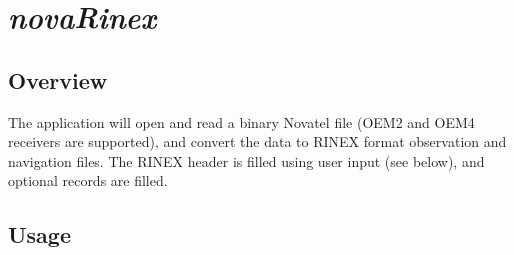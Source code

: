%
%

\section{\emph{novaRinex}}
\subsection{Overview}
The application will open and read a binary Novatel file
  (OEM2 and OEM4 receivers are supported), and convert the data to RINEX format
  observation and navigation files. The RINEX header is filled using user input
  (see below), and optional records are filled.

\subsection{Usage}

